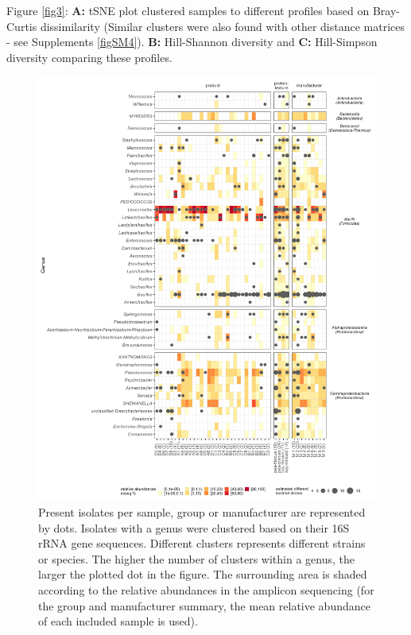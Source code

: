 \documentclass[preprint, 3p,
authoryear]{elsarticle} %
\begin{document}
Figure \ref{fig3}: \textbf{A:} tSNE plot clustered samples to different
profiles based on Bray-Curtis dissimilarity (Similar clusters were also
found with other distance matrices - see Supplements \ref{figSM4}).
\textbf{B:} Hill-Shannon diversity and \textbf{C:} Hill-Simpson
diversity comparing these profiles.

\begin{figure}

{\centering \includegraphics[width=1\linewidth]{Fig1inclmeanrelab} 

}

\caption{\label{fig1} Present isolates per sample, group or manufacturer are represented by dots. Isolates with a genus were clustered based on their 16S rRNA gene sequences. Different clusters represents different strains or species. The higher the number of clusters within a genus, the larger the plotted dot in the figure. The surrounding area is shaded according to the relative abundances in the amplicon sequencing (for the group and manufacturer summary, the mean relative abundance of each included sample is used).}\label{fig:fig1}
\end{figure}
\end{document}
